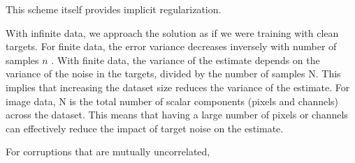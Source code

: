 This scheme itself provides implicit regularization.

With infinite data, we approach the solution as if we were training with clean targets. For finite data, the error variance decreases inversely with number of samples $n$ \cite[supplementary~material]{lehtinenNoise2NoiseLearningImage2018}. With finite data, the variance of the estimate depends on the variance of the noise in the targets, divided by the number of samples N. This implies that increasing the dataset size reduces the variance of the estimate. For image data, N is the total number of scalar components (pixels and channels) across the dataset. This means that having a large number of pixels or channels can effectively reduce the impact of target noise on the estimate.

For corruptions that are mutually uncorrelated, 




   
   







